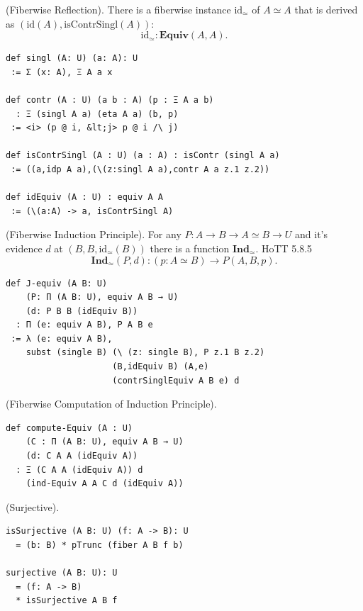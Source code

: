 \documentclass{article}
\begin{document}
\begin{definition} (Fiberwise Reflection).
There is a fiberwise instance $\mathrm{id_\simeq}$
of $A\simeq A$ that is derived
as $(\mathrm{id}(A),\mathrm{isContrSingl}(A))$:
$$
  \mathrm{id}_\simeq : \mathbf{Equiv}(A,A).
$$
\begin{lstlisting}
def singl (A: U) (a: A): U
 := Σ (x: A), Ξ A a x

def contr (A : U) (a b : A) (p : Ξ A a b)
  : Ξ (singl A a) (eta A a) (b, p)
 := <i> (p @ i, &lt;j> p @ i /\ j)

def isContrSingl (A : U) (a : A) : isContr (singl A a)
 := ((a,idp A a),(\(z:singl A a),contr A a z.1 z.2))

def idEquiv (A : U) : equiv A A
 := (\(a:A) -> a, isContrSingl A)
\end{lstlisting}
\end{definition}

\begin{theorem} (Fiberwise Induction Principle).
For any $P : A \rightarrow B \rightarrow A \simeq B \rightarrow U$
and it's evidence $d$ at $(B,B,\mathrm{id_\simeq}(B))$
there is a function $\mathbf{Ind}_\simeq$. HoTT 5.8.5
$$
  \mathbf{Ind}_\simeq(P,d) : (p: A\simeq B) \rightarrow P(A,B,p).
$$
\begin{lstlisting}
def J-equiv (A B: U)
    (P: Π (A B: U), equiv A B → U)
    (d: P B B (idEquiv B))
  : Π (e: equiv A B), P A B e
 := λ (e: equiv A B),
    subst (single B) (\ (z: single B), P z.1 B z.2)
                     (B,idEquiv B) (A,e)
                     (contrSinglEquiv A B e) d
\end{lstlisting}
\end{theorem}

\begin{theorem} (Fiberwise Computation of Induction Principle).
\begin{lstlisting}
def compute-Equiv (A : U)
    (C : Π (A B: U), equiv A B → U)
    (d: C A A (idEquiv A))
  : Ξ (C A A (idEquiv A)) d
    (ind-Equiv A A C d (idEquiv A))
\end{lstlisting}
\end{theorem}

\begin{definition} (Surjective).
\begin{lstlisting}
isSurjective (A B: U) (f: A -> B): U
  = (b: B) * pTrunc (fiber A B f b)

surjective (A B: U): U
  = (f: A -> B)
  * isSurjective A B f
\end{lstlisting}
\end{definition}
\end{document}
